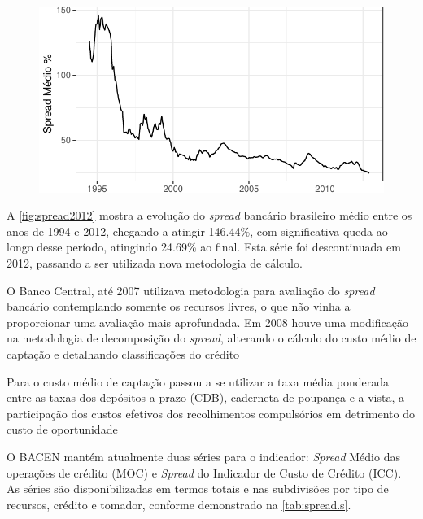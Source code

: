 \documentclass[12pt,12pt,openright,oneside,a4paper,chapter=TITLE,section=TITLE,subsection=TITLE,subsubsection=TITLE,english,french,spanish,portugues,sumario=tradicional]{abntex2}
\begin{document}
\begin{figure}

\begin{center}\includegraphics{12-exportedfigures/average spread-1} \end{center}
\label{fig:spread2012}
\end{figure}

A \autoref{fig:spread2012} mostra a evolução do \emph{spread} bancário brasileiro
médio entre os anos de 1994 e 2012, chegando a atingir 146.44\%, com
significativa queda ao longo desse período, atingindo 24.69\% ao final. Esta série foi descontinuada em 2012, passando a ser utilizada nova
metodologia de cálculo.

O Banco Central, até 2007 utilizava metodologia para avaliação do \emph{spread}
bancário contemplando somente os recursos livres, o que não vinha a
proporcionar uma avaliação mais aprofundada. Em 2008 houve uma modificação na
metodologia de decomposição do \emph{spread}, alterando o cálculo do custo médio de
captação e detalhando classificações do crédito \cite{dantas:2012}

Para o custo médio de captação passou a se utilizar a taxa média ponderada
entre as taxas dos depósitos a prazo (CDB), caderneta de poupança e a vista,
a participação dos custos efetivos dos recolhimentos compulsórios em detrimento
do custo de oportunidade \cite{dantas:2012}

O BACEN mantém atualmente duas séries para o indicador: \emph{Spread} Médio das operações de crédito (MOC) e \emph{Spread} do Indicador de Custo de Crédito (ICC). As séries são disponibilizadas em termos totais e nas subdivisões por tipo de
recursos, crédito e tomador, conforme demonstrado na \autoref{tab:spread.s}.
\end{document}
